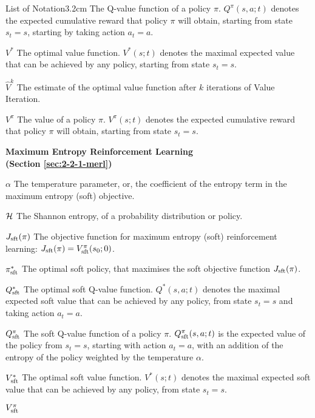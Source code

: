 \begin{mclistof}{List of Notation}{3.2cm}
        The Q-value function of a policy $\pi$. $Q^{\pi}(s,a;t)$ denotes the expected cumulative reward that policy $\pi$ will obtain, starting from state $s_t=s$, starting by taking action $a_t=a$.
    \item[$V^*$]
        The optimal value function. $V^*(s;t)$ denotes the maximal expected value that can be achieved by any policy, starting from state $s_t=s$.
    \item[$\hat{V}^k$]
        The estimate of the optimal value function after $k$ iterations of Value Iteration.
    \item[$V^{\pi}$]
        The value of a policy $\pi$. $V^{\pi}(s;t)$ denotes the expected cumulative reward that policy $\pi$ will obtain, starting from state $s_t=s$.
    \\
    \item[{\parbox[t]{\textwidth}{
        \Large\textbf{Maximum Entropy Reinforcement Learning \\(Section \ref{sec:2-2-1-merl})}\hfill\hfill
      }}]
    \item[$\alpha$] 
        The temperature parameter, or, the coefficient of the entropy term in the maximum entropy (soft) objective.
    \item[$\mathcal{H}$]
        The Shannon entropy, of a probability distribution or policy.
    \item[$J_{{\textnormal{sft}}}(\pi)$] 
        The objective function for maximum entropy (soft) reinforcement learning: $J_{{\textnormal{sft}}}(\pi) = V_{{\textnormal{sft}}}^{\pi}(s_0;0)$.
    \item[$\pi_{{\textnormal{sft}}}^*$]
        The optimal soft policy, that maximises the soft objective function $J_{{\textnormal{sft}}}(\pi)$.
    \item[$Q_{{\textnormal{sft}}}^*$]
        The optimal soft Q-value function. $Q^*(s,a;t)$ denotes the maximal expected soft value that can be achieved by any policy, from state $s_t=s$ and taking action $a_t=a$. 
    \item[$Q_{{\textnormal{sft}}}^{\pi}$]
        The soft Q-value function of a policy $\pi$. $Q_{{\textnormal{sft}}}^{\pi}(s,a;t)$ is the expected value of the policy from $s_t=s$, starting with action $a_t=a$, with an addition of the entropy of the policy weighted by the temperature $\alpha$.
    \item[$V_{{\textnormal{sft}}}^*$]
        The optimal soft value function. $V^*(s;t)$ denotes the maximal expected soft value that can be achieved by any policy, from state $s_t=s$. 
    \item[$V_{{\textnormal{sft}}}^{\pi}$]

\end{mclistof}
